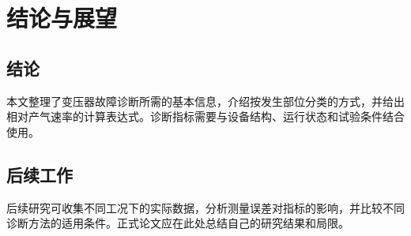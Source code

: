 \chapter{结论与展望}

\section{结论}
本文整理了变压器故障诊断所需的基本信息，介绍按发生部位分类的方式，并给出相对产气速率的计算表达式。诊断指标需要与设备结构、运行状态和试验条件结合使用。

\section{后续工作}
后续研究可收集不同工况下的实际数据，分析测量误差对指标的影响，并比较不同诊断方法的适用条件。正式论文应在此处总结自己的研究结果和局限。
